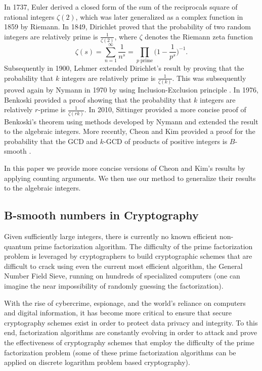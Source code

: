 \documentclass[12pt]{amsart}
\theoremstyle{definition}
\begin{document}
In 1737, Euler derived a closed form of the sum of the reciprocals square of rational integers $\zeta(2)$, which was later generalized as a complex function in 1859 by Riemann. In 1849, Dirichlet \cite{Dirichlet} proved that the probability of two random integers are relatively prime is $\frac{1}{\zeta(2)}$, where $\zeta$ denotes the Riemann zeta function
$$\zeta(s) = \sum_{n=1}^{\infty} \frac{1}{n^s} = \prod_{p \; \text{prime}} \Big(1 - \frac{1}{p^s}\Big)^{-1}.$$
Subsequently in 1900, Lehmer \cite{Lehmer} extended Dirichlet's result by proving that the probability that $k$ integers are relatively prime is $\frac{1}{\zeta(k)}$. This was subsequently proved again by Nymann in 1970 by using Inclusion-Exclusion principle \cite{Nymann}. In 1976, Benkoski \cite{Benkoski} provided a proof showing that the probability that $k$ integers are relatively $r$-prime is $\frac{1}{\zeta(rk)}$. In 2010, Sittinger \cite{Sittinger} provided a more concise proof of Benkoski's theorem using methods developed by Nymann and extended the result to the algebraic integers. More recently, Cheon and Kim provided a proof for the probability that the GCD and $k$-GCD of products of positive integers is $B$-smooth \cite{Cheon}.

In this paper we provide more concise versions of Cheon and Kim's results by applying counting arguments. We then use our method to generalize their results to the algebraic integers. 

\subsection{B-smooth numbers in Cryptography}
Given sufficiently large integers, there is currently no known efficient non-quantum prime factorization algorithm.
The difficulty of the prime factorization problem is leveraged by cryptographers to build cryptographic schemes that are difficult to crack using even the current most efficient algorithm, the General Number Field Sieve, running on hundreds of specialized computers (one can imagine the near impossibility of randomly guessing the factorization). 

With the rise of cybercrime, espionage, and the world's reliance on computers and digital information, it has become more critical to ensure that secure cryptography schemes exist in order to protect data privacy and integrity. To this end, factorization algorithms are constantly evolving in order to attack and prove the effectiveness of cryptography schemes that employ the difficulty of the prime factorization problem (some of these prime factorization algorithms can be applied on discrete logarithm problem based cryptography).
\end{document}
